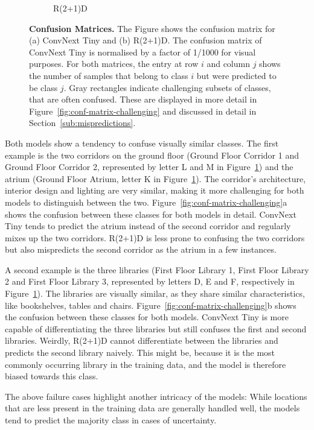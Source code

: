 \documentclass[a4paper]{article}
\begin{document}
\begin{figure}
\begin{subfigure}[b]{0.49\textwidth}
    \caption{R(2+1)D}
  \end{subfigure}
  \caption{ \textbf{Confusion Matrices.} The Figure shows the confusion matrix
    for (a) ConvNext Tiny and (b) R(2+1)D. The confusion matrix of ConvNext Tiny
    is normalised by a factor of 1/1000 for visual purposes. For both matrices,
    the entry at row $i$ and column $j$ shows the number of samples that belong
    to class $i$ but were predicted to be class $j$. Gray rectangles indicate
    challenging subsets of classes, that are often confused. These are displayed
    in more detail in Figure~\ref{fig:conf-matrix-challenging} and discussed in
    detail in Section~\ref{sub:mispredictions}.}
  \label{fig:conf-matrix}
\end{figure}

Both models show a tendency to confuse visually similar classes. The first
example is the two corridors on the ground floor (Ground Floor Corridor 1 and
Ground Floor Corridor 2, represented by letter L and M in
Figure~\ref{fig:conf-matrix}) and the atrium (Ground Floor Atrium, letter K in
Figure~\ref{fig:conf-matrix}). The corridor's architecture, interior design and
lighting are very similar, making it more challenging for both models to
distinguish between the two. Figure~\ref{fig:conf-matrix-challenging}a shows the
confusion between these classes for both models in detail. ConvNext Tiny tends
to predict the atrium instead of the second corridor and regularly mixes up the
two corridors. R(2+1)D is less prone to confusing the two corridors but also
mispredicts the second corridor as the atrium in a few instances.

A second example is the three libraries (First Floor Library 1, First Floor
Library 2 and First Floor Library 3, represented by letters D, E and F,
respectively in Figure~\ref{fig:conf-matrix}). The libraries are visually
similar, as they share similar characteristics, like bookshelves, tables and
chairs. Figure~\ref{fig:conf-matrix-challenging}b shows the confusion between
these classes for both models. ConvNext Tiny is more capable of differentiating
the three libraries but still confuses the first and second libraries. Weirdly,
R(2+1)D cannot differentiate between the libraries and predicts the second
library naively. This might be, because it is the most commonly occurring
library in the training data, and the model is therefore biased towards this
class.

The above failure cases highlight another intricacy of the models: While
locations that are less present in the training data are generally handled well,
the models tend to predict the majority class in cases of uncertainty.
\end{document}
